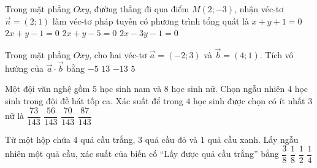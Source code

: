 \begin{ex}%
Trong mặt phẳng $ Oxy$, đường thẳng đi qua điểm $ M(2;-3)$, nhận véc-tơ $\overrightarrow{n}=\left(2;1\right)$ làm véc-tơ pháp tuyến có phương trình tổng quát là
\choice
{$ x+y+1=0$}
{\True $ 2x+y-1=0$}
{$ 2x+y-5=0$}
{$ 2x-3y-1=0$}
\end{ex}

\begin{ex}%
Trong mặt phẳng $Oxy$, cho hai véc-tơ $\overrightarrow{a}=(-2;3)$ và $\overrightarrow{b}=(4;1)$. Tích vô hướng của $\overrightarrow{a}\cdot \overrightarrow{b}$ bằng
\choice
{\True $-5$}
{$13$}
{$-13$}
{$5$}
\end{ex}

\begin{ex}%
Một đội văn nghệ gồm $5$ học sinh nam và $8$ học sinh nữ. Chọn ngẫu nhiên $4$ học sinh trong đội đề hát tốp ca. Xác suất để trong $4$ học sinh được chọn có ít nhất $3$ nữ là
\choice
{$\dfrac{73}{143}$}
{$\dfrac{56}{143}$}
{\True $\dfrac{70}{143}$}
{$\dfrac{87}{143}$}
\end{ex}

\begin{ex}%
Từ một hộp chứa $4$ quả cầu trắng, $3$ quả cầu đỏ và $1$ quả cầu xanh. Lấy ngẫu nhiên một quả cầu, xác suất của biến cố “Lấy được quả cầu trắng” bằng
\choice
{$\dfrac{3}{8}$}
{$\dfrac{1}{8}$}
{\True $\dfrac{1}{2}$}
{$\dfrac{1}{4}$}
\end{ex}

